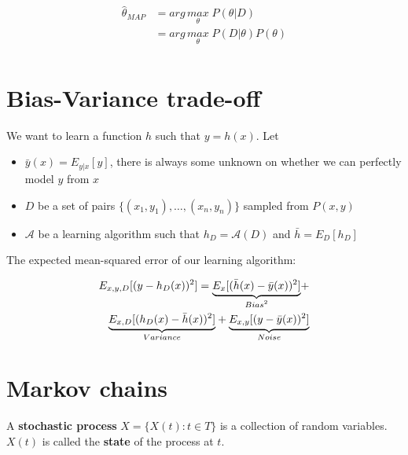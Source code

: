 \documentclass[../main.tex]{subfiles}
\begin{document}
\begin{align*}
    \hat{\theta}_{MAP} & = arg\,\underset{\theta}{max}\; P(\theta | D)           \\
                       & = arg\,\underset{\theta}{max}\; P(D | \theta) P(\theta) \\
\end{align*}

\section{Bias-Variance trade-off}
We want to learn a function $h$ such that $y = h(x)$.
Let
\begin{itemize}
    \item $\bar{y}(x) = E_{y|x}[y]$, there is always some unknown on whether we can perfectly model $y$ from $x$
    \item $D$ be a set of pairs $\{(x_1,y_1),\dots,(x_n,y_n)\}$ sampled from $P(x, y)$
    \item $\mathcal{A}$ be a learning algorithm such that $h_D = \mathcal{A}(D)$ and $\bar{h} = E_D[h_D]$
\end{itemize}
The expected mean-squared error of our learning algorithm:

\begin{align*}
    E_{x,y,D}[(y - h_D(x))^2] =
    {\underbrace{E_{x}[(\bar{h}(x) - \bar{y}(x))^2]}_{\mathclap{Bias^2}}} + \\
    {\underbrace{E_{x,D}[(h_D(x) - \bar{h}(x))^2]}_{\mathclap{Variance}}} +
    {\underbrace{E_{x,y}[(y - \bar{y}(x))^2]}_{\mathclap{Noise}}}
\end{align*}

\section{Markov chains}

A \textbf{stochastic process} $X = \{X(t): t \in T\}$ is a collection of random variables. $X(t)$ is
called the \textbf{state} of the process at $t$.
\end{document}
